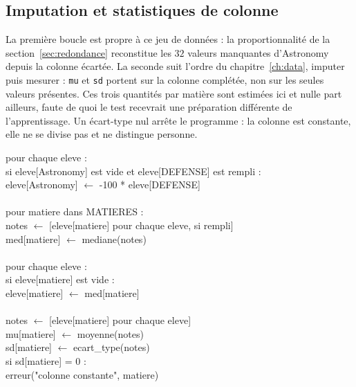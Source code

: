 \subsection{Imputation et statistiques de colonne}

La première boucle est propre à ce jeu de données : la proportionnalité de la
section~\ref{sec:redondance} reconstitue les $32$ valeurs manquantes d'Astronomy
depuis la colonne écartée. La seconde suit l'ordre du chapitre~\ref{ch:data},
imputer puis mesurer : \texttt{mu} et \texttt{sd} portent sur la colonne
complétée, non sur les seules valeurs présentes. Ces trois quantités par matière
sont estimées ici et nulle part ailleurs, faute de quoi le test recevrait une
préparation différente de l'apprentissage. Un écart-type nul arrête le
programme : la colonne est constante, elle ne se divise pas et ne distingue
personne.

\begin{pseudo}
pour chaque eleve :\\
\hspace*{2em}si eleve[Astronomy] est vide et eleve[DEFENSE] est rempli :\\
\hspace*{4em}eleve[Astronomy] $\leftarrow$ -100 * eleve[DEFENSE]\\
\\
pour matiere dans MATIERES :\\
\hspace*{2em}notes $\leftarrow$ [eleve[matiere] pour chaque eleve, si rempli]\\
\hspace*{2em}med[matiere] $\leftarrow$ mediane(notes)\\
\\
\hspace*{2em}pour chaque eleve :\\
\hspace*{4em}si eleve[matiere] est vide :\\
\hspace*{6em}eleve[matiere] $\leftarrow$ med[matiere]\\
\\
\hspace*{2em}notes $\leftarrow$ [eleve[matiere] pour chaque eleve]\\
\hspace*{2em}mu[matiere] $\leftarrow$ moyenne(notes)\\
\hspace*{2em}sd[matiere] $\leftarrow$ ecart\_type(notes)\\
\hspace*{2em}si sd[matiere] = 0 :\\
\hspace*{4em}erreur("colonne constante", matiere)
\end{pseudo}

